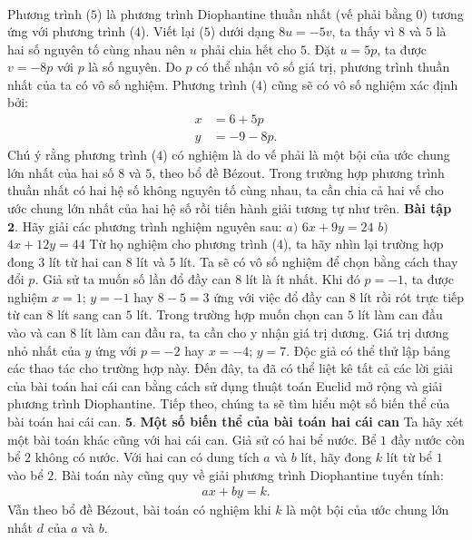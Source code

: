 \begin{multicols}{2}
\begin{align*}
	\end{align*}
	Phương trình ($5$) là phương trình Diophantine thuần nhất (vế phải bằng $0$) tương ứng với phương trình ($4$). Viết lại ($5$) dưới dạng $8u=-5v$, ta thấy vì $8$ và $5$ là hai số nguyên tố cùng nhau nên $u$ phải chia hết cho $5$. Đặt $u=5p$, ta được $v=-8p$ với $p$ là số nguyên. Do $p$ có thể nhận vô số giá trị, phương trình thuần nhất của ta có vô số nghiệm. 
	\vskip 0.1cm
	Phương trình ($4$) cũng sẽ có vô số nghiệm xác định bởi: 
	\begin{align*}
		x&=6+5p\\
		y&=-9-8p.
	\end{align*}
	Chú ý rằng phương trình ($4$) có nghiệm là do vế phải là một bội của ước chung lớn nhất của hai số $8$ và $5$, theo bổ đề Bézout. Trong trường hợp phương trình thuần nhất có hai hệ số không nguyên tố cùng nhau, ta cần chia cả hai vế cho ước chung lớn nhất của hai hệ số rồi tiến hành giải tương tự như trên.
	\vskip 0.1cm
	\textbf{\color{hoccungpi}Bài tập $\pmb{2.}$}
	Hãy giải các phương trình nghiệm nguyên sau:
	\vskip 0.1cm
	$a)$ $6x+9y=24$
	\vskip 0.1cm
	$b)$ $4x+12y=44$
	\vskip 0.1cm
	Từ họ nghiệm cho phương trình ($4$), ta hãy nhìn lại trường hợp đong $3$ lít từ hai can $8$ lít và $5$ lít. Ta sẽ có vô số nghiệm để chọn bằng cách thay đổi $p$. Giả sử ta muốn số lần đổ đầy can $8$ lít là ít nhất. Khi đó $p=-1$, ta được nghiệm $x=1$; $y=-1$ hay $8-5=3$ ứng với việc đổ đầy can $8$ lít rồi rót trực tiếp từ can $8$ lít sang can $5$ lít. Trong trường hợp muốn chọn can $5$ lít làm can đầu vào và can $8$ lít làm can đầu ra, ta cần cho y nhận giá trị dương. Giá trị dương nhỏ nhất của $y$ ứng với $p=-2$ hay $x=-4$; $y=7$. Độc giả có thể thử lập bảng các thao tác cho trường hợp này.
	\vskip 0.1cm
	Đến đây, ta đã có thể liệt kê tất cả các lời giải của bài toán hai cái can bằng cách sử dụng thuật toán Euclid mở rộng và giải phương trình Diophantine. Tiếp theo, chúng ta sẽ tìm hiểu một số biến thể của bài toán hai cái can.
	\vskip 0.1cm
	$\pmb{5.}$ \textbf{\color{hoccungpi}Một số biến thể của bài toán hai cái can}
	\vskip 0.1cm 
	Ta hãy xét một bài toán khác cũng với hai cái can. 
	\vskip 0.1cm
	Giả sử có hai bể nước. Bể $1$ đầy nước còn bể $2$ không có nước. Với hai can có dung tích $a$ và $b$ lít, hãy đong $k$ lít từ bể $1$ vào bể $2$.
	\vskip 0.1cm
	Bài toán này cũng quy về giải phương trình Diophantine tuyến tính:
	\begin{align*}
		ax+by=k.
	\end{align*}
	Vẫn theo bổ đề Bézout, bài toán có nghiệm khi $k$ là một bội của ước chung lớn nhất $d$ của $a$ và $b$.

\end{multicols}
